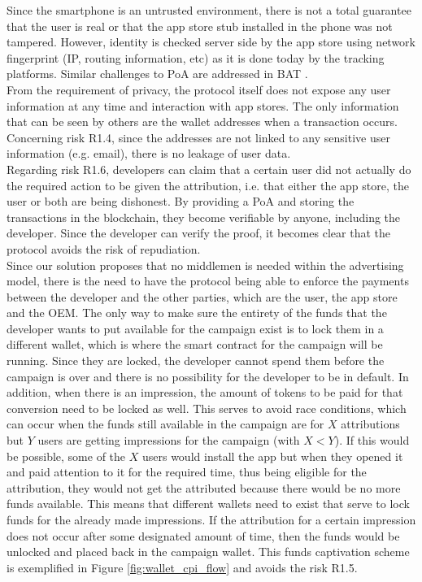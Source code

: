 Since the smartphone is an untrusted environment, there is not a total guarantee that the user is real or that the app store stub installed in the phone was not tampered. However, identity is checked server side by the app store using network fingerprint (IP, routing information, etc) as it is done today by the tracking platforms. Similar challenges to \textsf{PoA} are addressed in BAT \cite{BAT}. \\

From the requirement of privacy, the protocol itself does not expose any user information at any time and interaction with app stores. The only information that can be seen by others are the wallet addresses when a transaction occurs. Concerning risk \textsf{R1.4}, since the addresses are not linked to any sensitive user information (e.g. email), there is no leakage of user data. \\

Regarding risk \textsf{R1.6}, developers can claim that a certain user did not actually do the required action to be given the attribution, i.e. that either the app store, the user or both are being dishonest. By providing a \textsf{PoA} and storing the transactions in the blockchain, they become verifiable by anyone, including the developer. Since the developer can verify the proof, it becomes clear that the protocol avoids the risk of repudiation. \\

Since our solution proposes that no middlemen is needed within the advertising model, there is the need to have the protocol being able to enforce the payments between the developer and the other parties, which are the user, the app store and the OEM. The only way to make sure the entirety of the funds that the developer wants to put available for the campaign exist is to lock them in a different wallet, which is where the smart contract for the campaign will be running. Since they are locked, the developer cannot spend them before the campaign is over and there is no possibility for the developer to be in default. In addition, when there is an impression, the amount of tokens to be paid for that conversion need to be locked as well. This serves to avoid race conditions, which can occur when the funds still available in the campaign are for $X$ attributions but $Y$ users are getting impressions for the campaign (with $X < Y$). If this would be possible, some of the $X$ users would install the app but when they opened it and paid attention to it for the required time, thus being eligible for the attribution, they would not get the attributed because there would be no more funds available. This means that different wallets need to exist that serve to lock funds for the already made impressions. If the attribution for a certain impression does not occur after some designated amount of time, then the funds would be unlocked and placed back in the campaign wallet. This funds captivation scheme is exemplified in Figure \ref{fig:wallet_cpi_flow} and avoids the risk \textsf{R1.5}.\\

